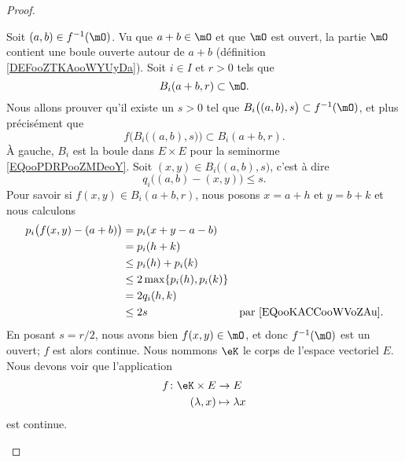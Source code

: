 \begin{proof}
\begin{subproof}
		Soit \( (a,b)\in f^{-1}(\mO)\). Vu que \( a+b\in \mO\) et que \( \mO\) est ouvert, la partie \( \mO\) contient une boule ouverte autour de \( a+b\) (définition \ref{DEFooZTKAooWYUyDa}). Soit \( i\in I\) et \( r>0\) tels que
		\begin{equation}
			B_i(a+b,r)\subset \mO.
		\end{equation}
		Nous allons prouver qu'il existe un \( s>0\) tel que \( B_i\big( (a,b),s \big)\subset f^{-1}(\mO)\), et plus précisément que
		\begin{equation}
			f\Big( B_i\big( (a,b),s \big) \Big)\subset B_i(a+b,r).
		\end{equation}
		À gauche, \( B_i\) est la boule dans \( E\times E\) pour la seminorme \eqref{EQooPDRPooZMDeoY}. Soit \( (x,y)\in B_i\big( (a,b),s \big)\), c'est à dire
		\begin{equation}    \label{EQooKACCooWVoZAu}
			q_i\big( (a,b)-(x,y) \big)\leq s.
		\end{equation}
		Pour savoir si \( f(x,y)\in B_i(a+b,r)\), nous posons \( x=a+h\) et \( y=b+k\) et nous calculons
		\begin{subequations}
			\begin{align}
				p_i\big( f(x,y)-(a+b) \big) & =p_i(x+y-a-b)                                                        \\
				                            & =p_i(h+k)                                                            \\
				                            & \leq p_i(h)+p_i(k)                                                   \\
				                            & \leq 2\max\{ p_i(h),p_i(k) \}                                        \\
				                            & =2q_i(h,k)                                                           \\
				                            & \leq 2s                       & \text{par \eqref{EQooKACCooWVoZAu}.}
			\end{align}
		\end{subequations}
		En posant \( s=r/2\), nous avons bien \( f(x,y)\in \mO\), et donc \( f^{-1}(\mO)\) est un ouvert; \( f\) est alors continue.
		\spitem[Produit]
		Nous nommons \( \eK\) le corps de l'espace vectoriel \( E\). Nous devons voir que l'application
		\begin{equation}
			\begin{aligned}
				f\colon \eK\times E & \to E             \\
				(\lambda,x)         & \mapsto \lambda x
			\end{aligned}
		\end{equation}
		est continue.


\end{subproof}
\end{proof}
